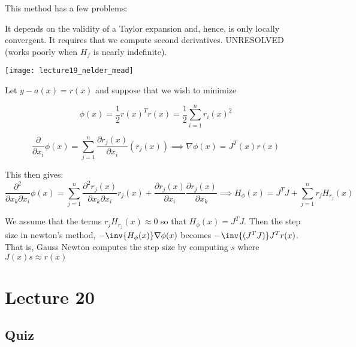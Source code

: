 \documentclass[../main.tex]{subfiles}
\begin{document}
\begin{remark}
    This method has a few problems:

    \begin{outline}
        \1 It depends on the validity of a Taylor expansion and, hence, is only 
        locally convergent.
        \1 It requires that we compute second derivatives.
        \1 UNRESOLVED (works poorly when $H_f$ is nearly indefinite).
    \end{outline}
\end{remark}


\begin{definition}


\begin{center}
    \texttt{[image: lecture19\_nelder\_mead]}
\end{center}

\end{definition}

\begin{definition}
    Let $y - a(x) = r(x)$ and suppose that we wish to minimize

    \[
        \phi(x) = \frac{1}{2}r(x)^Tr(x) = \frac{1}{2}\sum_{i=1}^{n}r_i(x)^2
    \]

    \[
    \frac{\partial}{\partial x_i}\phi(x) = \sum_{j=1}^{n} \frac{\partial r_j(x)}{ \partial x_i }(r_j(x)) \implies \nabla \phi(x) = J^T(x) r(x)
    \]

    This then gives:
    \[
        \frac{\partial^2}{\partial x_k \partial x_i}\phi(x) = \sum_{j=1}^{n} \frac{\partial^2 r_j(x)}{ \partial x_k \partial x_i }r_j(x) + \frac{\partial r_j(x)}{\partial x_i}  \frac{\partial r_j(x)}{\partial x_k} \implies H_{\phi}(x) = J^TJ + \sum_{j=1}^{n}r_{j} H_{r_{j}}(x)
    \]


    We assume that the terms $r_j H_{r_j}(x) \approx 0$ so that $H_{\phi}(x) = J^TJ$. Then the step size in newton's method, $- \inv{H_{\phi}(x)} \nabla \phi(x)$ becomes $- \inv{(J^TJ)}J^Tr(x)$. \\


    That is, Gauss Newton computes the step size by computing $s$ where $J(x)s \approx r(x)$

\end{definition}
\section{Lecture 20}

\subsection{Quiz}
\end{document}
